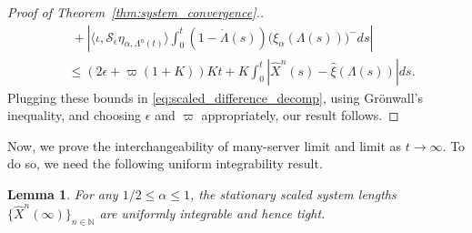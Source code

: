 \documentclass[a4paper,11pt,twoside]{article}
\numberwithin{equation}{section}
\numberwithin{figure}{section}
\theoremstyle{plain}
\newtheorem{lemma}[theorem]{Lemma}
\newcommand{\NN}{\mathbb{N}}
\newcommand{\1}{\mathbbm{1}}
\begin{document}
\begin{proof}[Proof of Theorem~\ref{thm:system_convergence}.]
\begin{align*}
 &\;+ \left|\langle\iota, \mathcal{S}_\epsilon\eta_{\alpha,\Lambda^n(t)}\rangle\int_0^{t}(1-\dot{\Lambda}(s))\big(\xi_\alpha(\Lambda(s))\big)^-ds\right|\\
& \leq (2\epsilon+\varpi(1+K)) Kt +K\int_0^{t}\left|\hat{X}^n(s)-\hat{\xi}(\Lambda(s))\right|ds.
 \end{align*}
Plugging these bounds in \eqref{eq:scaled_difference_decomp}, using Gr\"onwall's inequality, and choosing $\epsilon$ and $\varpi$ appropriately, our result follows. \end{proof}
\endproof
Now, we prove the interchangeability of many-server limit and limit as $t\to\infty$. To do so, we need the following uniform integrability result. 
 \begin{lemma}\label{lem:uniform_integrability_system}
For any $1/2\leq \alpha 
\leq 1$, the stationary scaled system lengths $\{\hat{X}^n(\infty)\}_{n\in \NN}$ are uniformly integrable and hence tight. 
\end{lemma}
\end{document}
